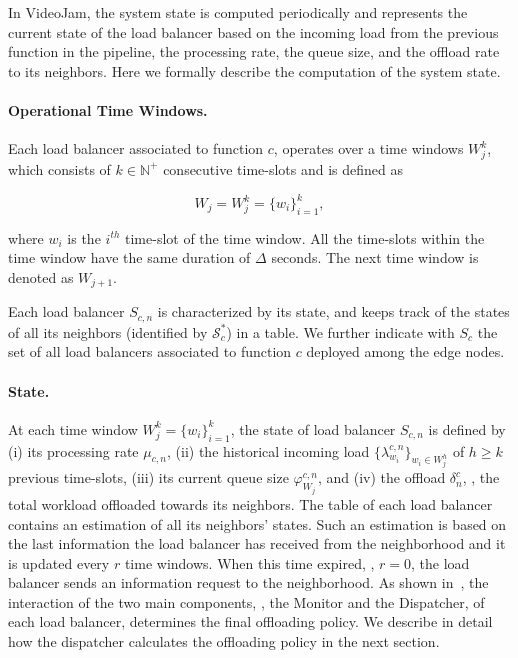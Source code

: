 In VideoJam, the system state is computed periodically and represents the current state of the load balancer based on the incoming load from the previous function in the pipeline, the processing rate, the queue size, and the offload rate to its neighbors. Here we formally describe the computation of the system state.

\paragraph{Operational Time Windows.} Each load balancer associated to function $c$, operates over a time windows $W^k_j$, which consists of $k \in \mathbb{N}^+$ consecutive time-slots and is defined as

\begin{equation*}
    W_{j} = W^k_{j} = \{w_i\}^k_{i=1},
\end{equation*}

where $w_i$ is the $i^{th}$ time-slot of the time window. All the time-slots within the time window have the same duration of $\Delta$ seconds. The next time window is denoted as $W_{j+1}$.

Each load balancer $S_{c,n}$ is characterized by its state, and keeps track of the states of all its neighbors (identified by $\mathcal{S}^*_{c}$) in a table. We further indicate with $S_{c}$ the set of all load balancers associated to function $c$ deployed among the edge nodes. 

\paragraph{State.} At each time window $W^k_{j} = \{w_i\}^k_{i=1}$, the state of load balancer $S_{c,n}$ is defined by (i) its processing rate $\mu_{c,n}$, (ii) the historical incoming load $\{\lambda^{c,n}_{w_i}\}_{w_i \in W^h_j}$ of $h \ge k$ previous time-slots, (iii) its current queue size $\varphi^{c,n}_{W_j}$, and (iv) the offload $\delta^c_n$, \ie, the total workload offloaded towards its neighbors. The table of each load balancer contains an estimation of all its neighbors' states. Such an estimation is based on the last information the load balancer has received from the neighborhood and it is updated every $r$ time windows. When this time expired, \ie, $r=0$, the load balancer sends an information request to the neighborhood. As shown in~, the interaction of the two main components, \ie, the Monitor and the Dispatcher, of each load balancer, determines the final offloading policy. We describe in detail how the dispatcher calculates the offloading policy in the next section.

